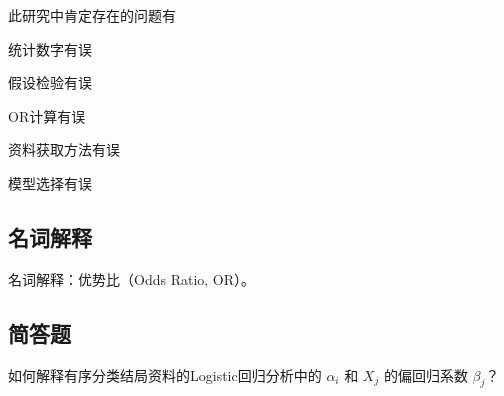 \par\addvspace{8pt}\noindent\begin{minipage}{\linewidth}


此研究中肯定存在的问题有


\begin{choices}

\item 统计数字有误

\item 假设检验有误

\item OR计算有误

\item 资料获取方法有误

\item 模型选择有误

\end{choices}

\end{minipage}\par\vspace{5pt}

\par\addvspace{8pt}\noindent\begin{minipage}{\linewidth}

\subsection{名词解释}


名词解释：优势比（Odds Ratio, OR）。



\end{minipage}\par\vspace{5pt}

\par\addvspace{8pt}\noindent\begin{minipage}{\linewidth}

\subsection{简答题}


如何解释有序分类结局资料的Logistic回归分析中的 \(\alpha_i\) 和 \(X_j\) 的偏回归系数 \(\beta_j\)？



\end{minipage}\par\vspace{5pt}

